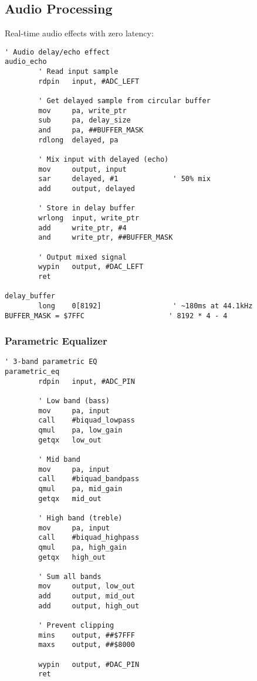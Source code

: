 \documentclass[11pt]{book}
\begin{document}
\hypertarget{audio-processing}{%
\subsection{Audio Processing}\label{audio-processing}}

Real-time audio effects with zero latency:

\begin{lstlisting}
' Audio delay/echo effect
audio_echo
        ' Read input sample
        rdpin   input, #ADC_LEFT
        
        ' Get delayed sample from circular buffer
        mov     pa, write_ptr
        sub     pa, delay_size
        and     pa, ##BUFFER_MASK
        rdlong  delayed, pa
        
        ' Mix input with delayed (echo)
        mov     output, input
        sar     delayed, #1             ' 50% mix
        add     output, delayed
        
        ' Store in delay buffer
        wrlong  input, write_ptr
        add     write_ptr, #4
        and     write_ptr, ##BUFFER_MASK
        
        ' Output mixed signal
        wypin   output, #DAC_LEFT
        ret

delay_buffer
        long    0[8192]                 ' ~180ms at 44.1kHz
BUFFER_MASK = $7FFC                    ' 8192 * 4 - 4
\end{lstlisting}

\hypertarget{parametric-equalizer}{%
\subsubsection{Parametric Equalizer}\label{parametric-equalizer}}

\begin{lstlisting}
' 3-band parametric EQ
parametric_eq
        rdpin   input, #ADC_PIN
        
        ' Low band (bass)
        mov     pa, input
        call    #biquad_lowpass
        qmul    pa, low_gain
        getqx   low_out
        
        ' Mid band
        mov     pa, input
        call    #biquad_bandpass
        qmul    pa, mid_gain
        getqx   mid_out
        
        ' High band (treble)
        mov     pa, input
        call    #biquad_highpass
        qmul    pa, high_gain
        getqx   high_out
        
        ' Sum all bands
        mov     output, low_out
        add     output, mid_out
        add     output, high_out
        
        ' Prevent clipping
        mins    output, ##$7FFF
        maxs    output, ##$8000
        
        wypin   output, #DAC_PIN
        ret
\end{lstlisting}
\end{document}
